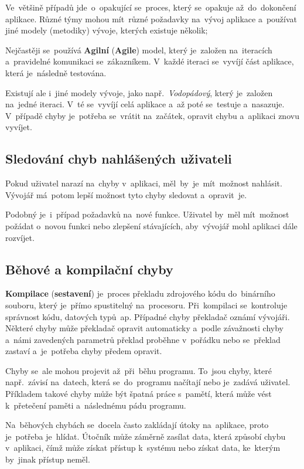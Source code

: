 \documentclass[11pt,a4paper]{report}
\begin{document}
                Ve~většině případů jde~o~opakující se~proces, který se~opakuje až~do~dokončení aplikace. Různé týmy mohou mít~různé požadavky na~vývoj aplikace a~používat jiné modely (metodiky) vývoje, kterých existuje několik;
                
                Nejčastěji se~používá \textbf{Agilní} (\textbf{Agile}) model, který je~založen na~iteracích a~pravidelné komunikaci se~zákazníkem. V~každé iteraci se~vyvíjí část aplikace, která je~následně testována.
                
                Existují ale i~jiné modely vývoje, jako např.~\emph{Vodopádový}, který je~založen na~jedné iteraci. V~té se~vyvíjí celá aplikace a~až poté se~testuje a~nasazuje. V~případě chyby je~potřeba se~vrátit na~začátek, opravit chybu a~aplikaci znovu vyvíjet. \cite{w3s:SDLC}

                \subsection{Sledování chyb nahlášených uživateli}
                Pokud uživatel narazí na~chyby v~aplikaci, měl~by~je~mít~možnost nahlásit. Vývojář má~potom lepší možnost tyto chyby sledovat a~opravit~je.

                Podobný je~i~případ požadavků na~nové funkce. Uživatel by~měl mít~možnost požádat o~novou funkci nebo zlepšení stávajících,
                aby~vývojář mohl aplikaci dále rozvíjet.

            \subsection{Běhové a kompilační chyby}
                \textbf{Kompilace} (\textbf{sestavení}) je~proces překladu zdrojového kódu do~binárního souboru, který je~přímo spustitelný na~procesoru. Při~kompilaci se~kontroluje správnost kódu, datových typů~ap. Případné chyby překladač oznámí vývojáři. Některé chyby může překladač opravit automaticky a~podle závažnosti chyby a~námi zavedených parametrů překlad proběhne v~pořádku nebo se~překlad zastaví a~je~potřeba chyby předem opravit.

                Chyby se~ale mohou projevit až~při~běhu programu. To~jsou chyby, které např.~závisí na~datech, která se~do~programu načítají nebo je~zadává uživatel. Příkladem takové chyby může být špatná práce s~pamětí, která může vést k~přetečení paměti a~následnému pádu programu.

                Na~běhových chybách se~docela často zakládají útoky na~aplikace, proto je~potřeba je~hlídat. Útočník může záměrně zasílat data, která způsobí chybu v~aplikaci, čímž může získat přístup k~systému nebo získat data, ke~kterým by~jinak přístup neměl.
\end{document}
